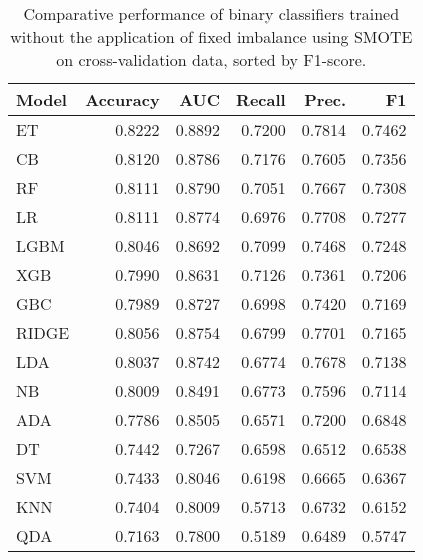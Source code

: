 \begin{table}
\caption{Comparative performance of binary classifiers trained without the application of fixed imbalance using SMOTE on cross-validation data, sorted by F1-score.}
\label{tbl:binary_False_SMOTE_cv_res_compare_models_df}
\begin{tabular}{lrrrrr}
\toprule
Model & Accuracy & AUC & Recall & Prec. & F1 \\
\midrule
ET & 0.8222 & 0.8892 & 0.7200 & 0.7814 & 0.7462 \\
CB & 0.8120 & 0.8786 & 0.7176 & 0.7605 & 0.7356 \\
RF & 0.8111 & 0.8790 & 0.7051 & 0.7667 & 0.7308 \\
LR & 0.8111 & 0.8774 & 0.6976 & 0.7708 & 0.7277 \\
LGBM & 0.8046 & 0.8692 & 0.7099 & 0.7468 & 0.7248 \\
XGB & 0.7990 & 0.8631 & 0.7126 & 0.7361 & 0.7206 \\
GBC & 0.7989 & 0.8727 & 0.6998 & 0.7420 & 0.7169 \\
RIDGE & 0.8056 & 0.8754 & 0.6799 & 0.7701 & 0.7165 \\
LDA & 0.8037 & 0.8742 & 0.6774 & 0.7678 & 0.7138 \\
NB & 0.8009 & 0.8491 & 0.6773 & 0.7596 & 0.7114 \\
ADA & 0.7786 & 0.8505 & 0.6571 & 0.7200 & 0.6848 \\
DT & 0.7442 & 0.7267 & 0.6598 & 0.6512 & 0.6538 \\
SVM & 0.7433 & 0.8046 & 0.6198 & 0.6665 & 0.6367 \\
KNN & 0.7404 & 0.8009 & 0.5713 & 0.6732 & 0.6152 \\
QDA & 0.7163 & 0.7800 & 0.5189 & 0.6489 & 0.5747 \\
\bottomrule
\end{tabular}
\end{table}
